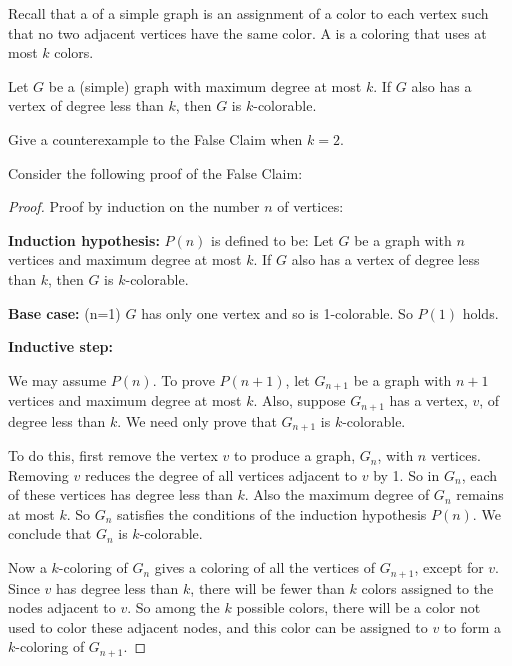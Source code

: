 \documentclass[12pt,twoside]{article}
\begin{document}
\begin{problem}{15}
Recall that a  of a simple graph is an assignment of a color
to each vertex such that no two adjacent vertices have the same color.  A
 is a coloring that uses at most $k$ colors.

\begin{falseclm*}
Let $G$ be a (simple) graph with maximum degree at most $k$.  If $G$ also
has a vertex of degree less than $k$, then $G$ is $k$-colorable.
\end{falseclm*}

\bparts {}\label{counterexample} Give a counterexample to the False
Claim when $k=2$. 


 Consider the following proof of the False Claim:

\begin{proof}

Proof by induction on the number $n$ of vertices:

{\bf Induction hypothesis:}
$P(n)$ is defined to be:  Let $G$ be a graph with $n$ vertices and maximum degree at most $k$.  If $G$ also has a vertex of degree less than $k$, then $G$ is $k$-colorable.

{\bf Base case:} (n=1) $G$ has only one vertex and so is 1-colorable.  So
$P(1)$ holds.

{\bf Inductive step:}

We may assume $P(n)$.  To prove $P(n+1)$, let $G_{n+1}$ be a graph with
$n+1$ vertices and maximum degree at most $k$.  Also, suppose $G_{n+1}$
has a vertex, $v$, of degree less than $k$.  We need only prove that
$G_{n+1}$ is $k$-colorable.

To do this, first remove the vertex $v$ to produce a graph, $G_n$, with
$n$ vertices.  Removing $v$ reduces the degree of all vertices adjacent to
$v$ by 1.  So in $G_n$, each of these vertices has degree less than $k$.
Also the maximum degree of $G_n$ remains at most $k$.  So $G_n$ satisfies
the conditions of the induction hypothesis $P(n)$.  We conclude that $G_n$
is $k$-colorable.

Now a $k$-coloring of $G_n$ gives a coloring of all the vertices of
$G_{n+1}$, except for $v$.  Since $v$ has degree less than $k$, there will
be fewer than $k$ colors assigned to the nodes adjacent to $v$.  So among
the $k$ possible colors, there will be a color not used to color these
adjacent nodes, and this color can be assigned to $v$ to form a
$k$-coloring of $G_{n+1}$.
\end{proof}


\end{problem}
\end{document}

